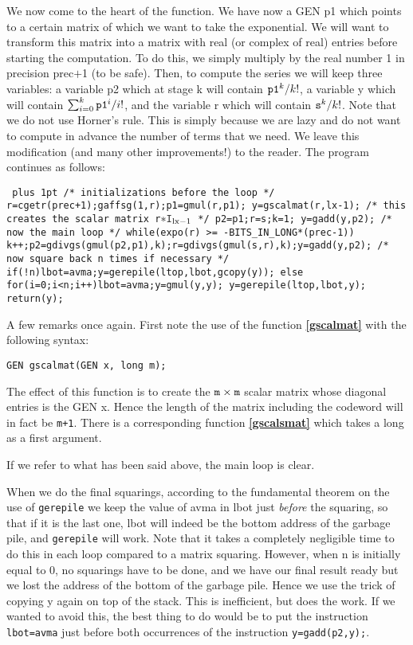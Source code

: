 We now come to the heart of the function. We have now a GEN p1 which points
to a certain matrix of which we want to take the exponential. We will want
to transform this matrix into a matrix with real (or complex of real) entries
before starting the computation. To do this, we simply multiply by the real
number 1 in precision prec$+$1 (to be safe). Then, to compute the series
we will keep three variables: a variable p2 which
at stage k will contain ${\tt p1}^k/k!$, a variable y which will contain
$\sum_{i=0}^k {\tt p1}^i/i!$, and the variable r which will contain
${\tt s}^k/k!$. Note that we do not use Horner's rule. This is simply
because we are lazy and do not want to compute in advance the number of
terms that we need. We leave this modification (and many other improvements!)
to the reader. The program continues as follows:

{\tt \obeylines\parskip=0pt plus 1pt
\hbox{}
/* initializations before the loop */
\hbox{}
\quad r=cgetr(prec+1);gaffsg(1,r);p1=gmul(r,p1);
\quad y=gscalmat(r,lx-1); /* this creates the scalar matrix r$*{\tt I_{\text {lx-1}}}$ */
\quad p2=p1;r=s;k=1;
\quad y=gadd(y,p2);
\hbox{}
  /* now the main loop */
\hbox{}
\quad while(expo(r) >= -BITS\_IN\_LONG*(prec-1))
\qquad \obr k++;p2=gdivgs(gmul(p2,p1),k);r=gdivgs(gmul(s,r),k);y=gadd(y,p2);\cbr 
\hbox{}
  /* now square back n times if necessary */
\hbox{}
\quad if(!n)\obr lbot=avma;y=gerepile(ltop,lbot,gcopy(y));\cbr 
\quad else
\quad \obr 
\qquad for(i=0;i<n;i++)\obr lbot=avma;y=gmul(y,y);\cbr 
\qquad y=gerepile(ltop,lbot,y);
\quad \cbr 
\quad return(y);
\cbr 
}

A few remarks once again. First note the use of the function {\bf \ref{gscalmat}}
with the following syntax:

{\tt GEN gscalmat(GEN x, long m);}

The effect of this function is to create the ${\tt m}\times{\tt m}$ scalar
matrix whose diagonal entries is the GEN x. Hence the length of
the matrix including the codeword will in fact be {\tt m+1}.
There is a corresponding function
{\bf \ref{gscalsmat}} which takes a long as a first argument. 

If we refer to what has been said above, the main loop is clear.

When we do the final squarings, according to the fundamental theorem on the
use of {\tt gerepile} we keep the value of avma in lbot just {\it before} the
squaring, so that if it is the last one, lbot will indeed be the bottom address
of the garbage pile, and {\tt gerepile} will work. Note that it takes a completely
negligible time to do this in each loop compared to a matrix squaring.
However, when n is initially equal to 0, no squarings have to be done,
and we have our final result ready but we lost the address of the bottom of
the garbage pile. Hence we use the trick of copying y again on top of the
stack. This is inefficient, but does the work. If we wanted to avoid this,
the best thing to do would be to put the instruction {\tt lbot=avma} just before
both occurrences of the instruction {\tt y=gadd(p2,y);}.


